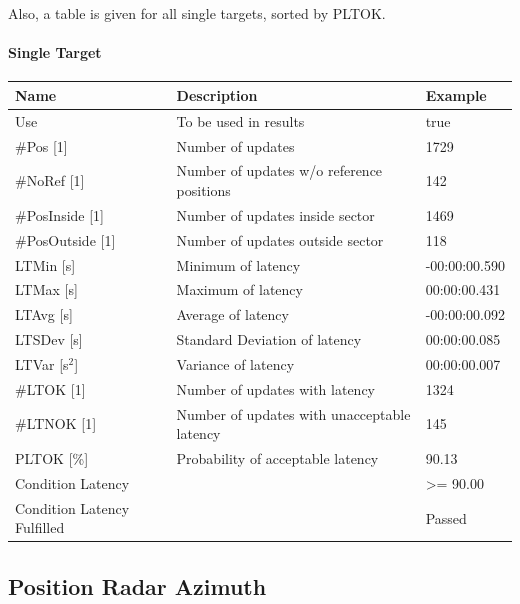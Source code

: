 Also, a table is given for all single targets, sorted by PLTOK.

\paragraph{Single Target}

\begin{center}
 \begin{table}[H]
  \begin{tabularx}{\textwidth}{ | l | X |  l | }
    \hline
    \textbf{Name} & \textbf{Description} & \textbf{Example} \\ \hline
    Use & To be used in results & true \\ \hline
    \#Pos [1] & Number of updates & 1729 \\ \hline
    \#NoRef [1] & Number of updates w/o reference positions & 142 \\ \hline
    \#PosInside [1] & Number of updates inside sector & 1469 \\ \hline
    \#PosOutside [1] & Number of updates outside sector & 118 \\ \hline
    LTMin [s] & Minimum of latency & -00:00:00.590 \\ \hline
    LTMax [s] & Maximum of latency & 00:00:00.431 \\ \hline
    LTAvg [s] & Average of latency & -00:00:00.092 \\ \hline
    LTSDev [s] & Standard Deviation of latency & 00:00:00.085 \\ \hline
    LTVar [s$^2$] & Variance of latency & 00:00:00.007 \\ \hline
    \#LTOK [1] & Number of updates with latency & 1324 \\ \hline
    \#LTNOK [1] & Number of updates with unacceptable latency  & 145 \\ \hline
    PLTOK [\%] & Probability of acceptable latency & 90.13 \\ \hline
    Condition Latency &  & >= 90.00 \\ \hline
    Condition Latency Fulfilled &  & Passed \\ \hline
\end{tabularx}
\end{table}
\end{center}


%
\subsection{Position Radar Azimuth}
\label{sec:eval_req_pos_radar_azm} 


